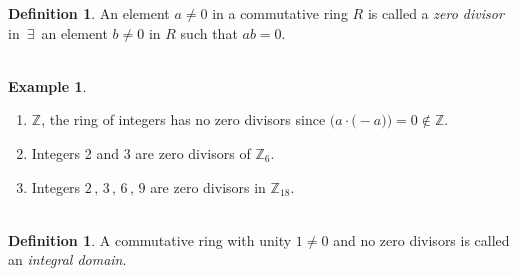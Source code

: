 \documentclass[11pt,a4paper]{article}
\theoremstyle{definition}
\newtheorem{defn}[thm]{Definition}
\newtheorem{exa}[thm]{Example}
\begin{document}
\begin{defn}
An element $a\neq 0$ in a commutative ring $R$ is called a \textit{zero divisor} in $\,\exists\,$ an element $b\neq 0$ in $R$ such that $ab = 0$.\\\\
\end{defn}



\begin{exa}
\begin{enumerate}
\item $\mathbb{Z}$, the ring of integers has no zero divisors since $\big(a\cdot \big(-a\big)\big) = 0\not\in \mathbb{Z}$.
\item Integers 2 and 3 are zero divisors of $\mathbb{Z}_6$.
\item Integers $2\, , \, 3\, , \, 6\, , \, 9$ are zero divisors in $\mathbb{Z}_{18}$.\\\\
\end{enumerate}
\end{exa}









\begin{defn}
A commutative ring with unity $1\neq 0$ and no zero divisors is called an \textit{integral domain}.\\\\\
\end{defn}
\end{document}
